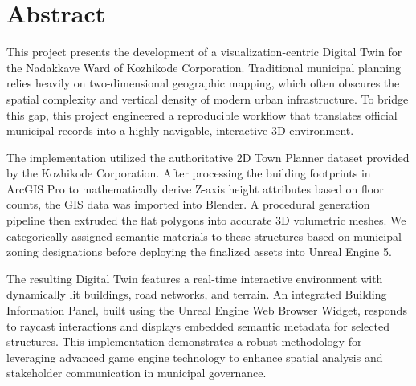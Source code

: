 \chapter*{Abstract}

This project presents the development of a visualization-centric Digital Twin for the Nadakkave Ward of Kozhikode Corporation. Traditional municipal planning relies heavily on two-dimensional geographic mapping, which often obscures the spatial complexity and vertical density of modern urban infrastructure. To bridge this gap, this project engineered a reproducible workflow that translates official municipal records into a highly navigable, interactive 3D environment.

The implementation utilized the authoritative 2D Town Planner dataset provided by the Kozhikode Corporation. After processing the building footprints in ArcGIS Pro to mathematically derive Z-axis height attributes based on floor counts, the GIS data was imported into Blender. A procedural generation pipeline then extruded the flat polygons into accurate 3D volumetric meshes. We categorically assigned semantic materials to these structures based on municipal zoning designations before deploying the finalized assets into Unreal Engine 5.

The resulting Digital Twin features a real-time interactive environment with dynamically lit buildings, road networks, and terrain. An integrated Building Information Panel, built using the Unreal Engine Web Browser Widget, responds to raycast interactions and displays embedded semantic metadata for selected structures. This implementation demonstrates a robust methodology for leveraging advanced game engine technology to enhance spatial analysis and stakeholder communication in municipal governance.
\newpage
